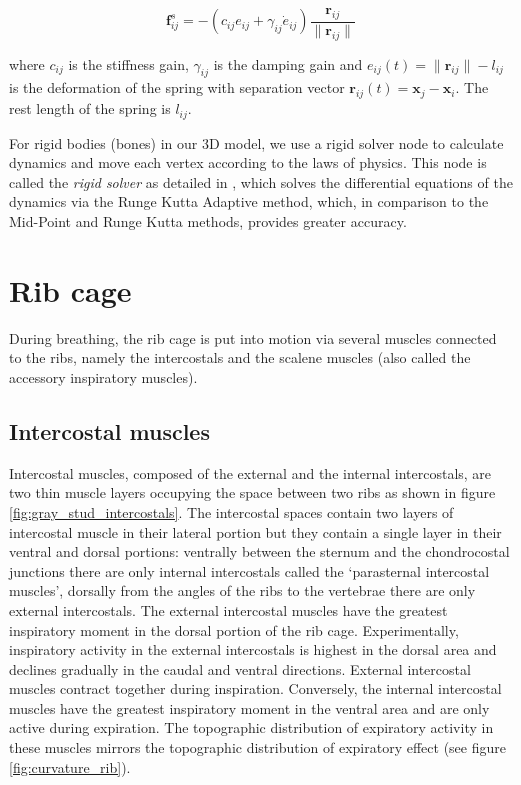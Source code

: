 \begin{equation} \label{eq:spring_muscle} \mathbf{f}_{ij}^s = -( c_{ij} e_{ij} + \gamma_{ij} \dot{e}_{ij} ) \frac{\mathbf{r}_{ij}}{\lVert \mathbf{r}_{ij} \rVert} \end{equation}

where $ c_{ij} $ is the stiffness gain, $ \gamma_{ij} $ is the damping gain and $ e_{ij}(t) = \lVert \mathbf{r}_{ij} \rVert - l_{ij} $ is the deformation of the spring with separation vector $ \mathbf{r}_{ij}(t) = \mathbf{x}_{j} - \mathbf{x}_{i} $. The rest length of the spring is $ l_{ij} $.

For rigid bodies (bones) in our 3D model, we use a rigid solver node to calculate dynamics and move each vertex according to the laws of physics. This node is called the \emph{rigid solver} as detailed in \cite{jameson1981numerical}, which solves the differential equations of the dynamics via the Runge Kutta Adaptive method, which, in comparison to the Mid-Point and Runge Kutta methods, provides greater accuracy.

\section{\label{sec:rib_cage}Rib cage}
During breathing, the rib cage is put into motion via several muscles connected to the ribs, namely the intercostals and the scalene muscles (also called the accessory inspiratory muscles).

\subsection{\label{subsec:intercostal_mus}Intercostal muscles}
Intercostal muscles, composed of the external and the internal intercostals, are two thin muscle layers occupying the space between two ribs as shown in figure \ref{fig:gray_stud_intercostals}. The intercostal spaces contain two layers of intercostal muscle in their lateral portion but they contain a single layer in their ventral and dorsal portions: ventrally between the sternum and the chondrocostal junctions there are only internal intercostals called the `parasternal intercostal muscles', dorsally from the angles of the ribs to the vertebrae there are only external intercostals. The external intercostal muscles have the greatest inspiratory moment in the dorsal portion of the rib cage. Experimentally, inspiratory activity in the external intercostals is highest in the dorsal area and declines gradually in the caudal and ventral directions. External intercostal muscles contract together during inspiration. Conversely, the internal intercostal muscles have the greatest inspiratory moment in the ventral area and are only active during expiration. The topographic distribution of expiratory activity in these muscles mirrors the topographic distribution of expiratory effect (see figure \ref{fig:curvature_rib}).

